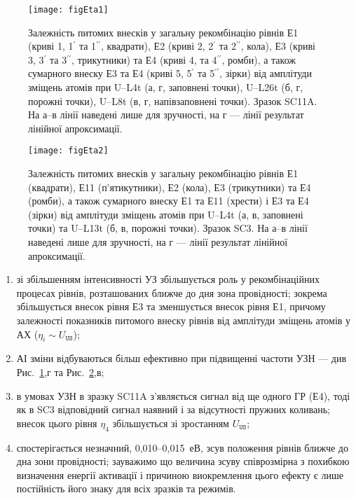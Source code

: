 \begin{figure}
\center
\texttt{[image: figEta1]}
\caption{\label{figEta1}
Залежність питомих внесків у загальну рекомбінацію рівнів
Е1 (криві 1, 1$^{\prime}$ та 1$^{\prime\prime}$, квадрати),
Е2 (криві 2, 2$^{\prime}$ та 2$^{\prime\prime}$, кола),
Е3 (криві 3, 3$^{\prime}$ та 3$^{\prime\prime}$, трикутники)
та Е4 (криві 4, та 4$^{\prime\prime}$, ромби),
а також сумарного внеску
Е3 та Е4 (криві 5, 5$^{\prime}$ та 5$^{\prime\prime}$, зірки)
від амплітуди зміщень атомів
при U--L4t (а, г, заповнені точки),
U--L26t (б, г, порожні точки),
U--L8t (в, г, напівзаповнені точки).
Зразок SC11A.
На а--в лінії наведені лише для зручності,
на г --- лінії результат лінійної апроксимації.
}%
\end{figure}

\begin{figure}
\center
\texttt{[image: figEta2]}
\caption{\label{figEta2}
Залежність питомих внесків у загальну рекомбінацію рівнів
Е1 (квадрати),
Е11 (п'ятикутники),
Е2 (кола),
Е3 (трикутники)
та Е4 (ромби),
а також сумарного внеску
Е1 та Е11 (хрести) і
Е3 та Е4 (зірки)
від амплітуди зміщень атомів
при U--L4t (а, в, заповнені точки) та
U--L13t (б, в, порожні точки).
Зразок SC3.
На а--в лінії наведені лише для зручності,
на г --- лінії результат лінійної апроксимації.
}%
\end{figure}

\begin{enumerate}[label=\asbuk*),leftmargin=0em,itemindent=1.5em]
\item зі збільшенням інтенсивності УЗ збільшується роль у рекомбінаційних процесах рівнів, розташованих ближче до дня зона провідності; зокрема збільшується внесок рівня Е3 та зменшується внесок рівня Е1, причому залежності показників питомого внеску рівнів від амплітуди зміщень атомів у  АХ ($\eta_i\sim U_\mathtt{US}$);
\item АІ зміни відбуваються більш ефективно при підвищенні частоти УЗН --- див Рис.~\ref{figEta1},г та Рис.~\ref{figEta2},в;
\item в умовах УЗН в зразку SC11A з'являється сигнал від ще одного ГР (Е4), тоді як в SC3 відповідний сигнал наявний і за відсутності пружних коливань; внесок цього рівня $\eta_4$ збільшується зі зростанням $U_\mathtt{US}$;
\item спостерігається незначний, 0,010--0,015~еВ, зсув положення рівнів ближче до дна зони провідності; зауважимо що величина зсуву співрозмірна з похибкою визначення енергії активації і причиною виокремлення цього ефекту є лише постійність його знаку для всіх зразків та режимів.
\end{enumerate}

